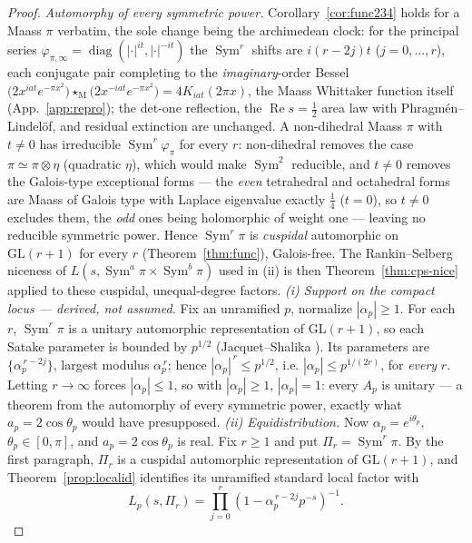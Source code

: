 \documentclass[11pt]{article}
\theoremstyle{definition}
\renewcommand{\Re}{\operatorname{Re}}
\newcommand{\Sym}{\operatorname{Sym}}
\begin{document}
\begin{proof}
\emph{Automorphy of every symmetric power.} Corollary~\ref{cor:func234} holds for a Maass $\pi$ verbatim, the
sole change being the archimedean clock: for the principal series
$\varphi_{\pi,\infty}=\operatorname{diag}(|\cdot|^{it},|\cdot|^{-it})$ the $\Sym^r$ shifts are $i(r-2j)t$
($j=0,\dots,r$), each conjugate pair completing to the \emph{imaginary}-order Bessel
$\big(2x^{iat}e^{-\pi x^2}\big)\star_{\mathrm M}\big(2x^{-iat}e^{-\pi x^2}\big)=4K_{iat}(2\pi x)$, the Maass
Whittaker function itself (App.~\ref{app:repro}); the det-one reflection, the $\Re s=\tfrac12$ area law with
Phragm\'en--Lindel\"of, and residual extinction are unchanged. A non-dihedral Maass $\pi$ with $t\neq0$ has
irreducible $\Sym^r\varphi_\pi$ for every $r$: non-dihedral removes the case $\pi\simeq\pi\otimes\eta$ (quadratic
$\eta$), which would make $\Sym^2$ reducible, and $t\neq0$ removes the Galois-type exceptional forms --- the
\emph{even} tetrahedral and octahedral forms are Maass of Galois type with Laplace eigenvalue exactly $\tfrac14$
($t=0$), so $t\neq0$ excludes them, the \emph{odd} ones being holomorphic of weight one --- leaving no reducible
symmetric power. Hence $\Sym^r\pi$ is \emph{cuspidal} automorphic on $\mathrm{GL}(r+1)$ for
every $r$ (Theorem~\ref{thm:func}), Galois-free. The Rankin--Selberg niceness of $L(s,\Sym^a\pi\times\Sym^b\pi)$
used in (ii) is then Theorem~\ref{thm:cps-nice} applied to these cuspidal, unequal-degree factors.
\emph{(i) Support on the compact locus --- derived, not assumed.} Fix an unramified $p$, normalize
$|\alpha_p|\ge1$. For each $r$, $\Sym^r\pi$ is a unitary automorphic representation of $\mathrm{GL}(r+1)$, so
each Satake parameter is bounded by $p^{1/2}$ (Jacquet--Shalika \cite{JS}). Its parameters are
$\{\alpha_p^{\,r-2j}\}$, largest modulus $\alpha_p^{\,r}$; hence $|\alpha_p|^{\,r}\le p^{1/2}$, i.e.
$|\alpha_p|\le p^{1/(2r)}$, for \emph{every} $r$. Letting $r\to\infty$ forces $|\alpha_p|\le1$, so with
$|\alpha_p|\ge1$, $|\alpha_p|=1$: every $A_p$ is unitary --- a theorem from the automorphy of every symmetric
power, exactly what $a_p=2\cos\theta_p$ would have presupposed.
\emph{(ii) Equidistribution.} Now $\alpha_p=e^{i\theta_p}$, $\theta_p\in[0,\pi]$, and
$a_p=2\cos\theta_p$ is real.  Fix $r\ge1$ and put $\Pi_r=\Sym^r\pi$.  By the first paragraph,
$\Pi_r$ is a cuspidal automorphic representation of $\mathrm{GL}(r+1)$, and
Theorem~\ref{prop:localid} identifies its unramified standard local factor with
\[
 L_p(s,\Pi_r)=\prod_{j=0}^{r}
   \left(1-\alpha_p^{\,r-2j}p^{-s}\right)^{-1}.
\]
\end{proof}
\end{document}
